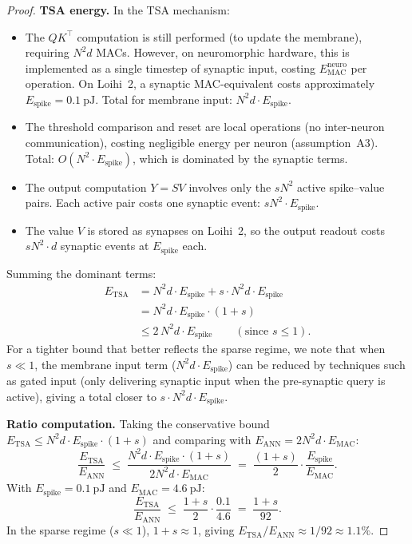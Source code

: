 \documentclass{article}
\begin{document}
\begin{proof}
\medskip
\noindent\textbf{TSA energy.}
In the TSA mechanism:
\begin{itemize}
  \item The $QK^\top$ computation is still performed (to update the
    membrane), requiring $N^2 d$ MACs.  However, on neuromorphic
    hardware, this is implemented as a single timestep of synaptic
    input, costing $E_{\mathrm{MAC}}^{\mathrm{neuro}}$ per operation.
    On Loihi~2, a synaptic MAC-equivalent costs approximately
    $E_{\mathrm{spike}} = 0.1~\mathrm{pJ}$.
    Total for membrane input: $N^2 d \cdot E_{\mathrm{spike}}$.

  \item The threshold comparison and reset are local operations
    (no inter-neuron communication), costing negligible energy
    per neuron (assumption~A3).  Total: $O(N^2 \cdot E_{\mathrm{spike}})$,
    which is dominated by the synaptic terms.

  \item The output computation $Y = SV$ involves only the $s N^2$
    active spike--value pairs.  Each active pair costs one synaptic
    event: $s N^2 \cdot E_{\mathrm{spike}}$.

  \item The value $V$ is stored as synapses on Loihi~2, so the
    output readout costs $s N^2 \cdot d$ synaptic events at
    $E_{\mathrm{spike}}$ each.
\end{itemize}

Summing the dominant terms:
\begin{align*}
  E_{\mathrm{TSA}}
  &= N^2 d \cdot E_{\mathrm{spike}}
     + s \cdot N^2 d \cdot E_{\mathrm{spike}}\\
  &= N^2 d \cdot E_{\mathrm{spike}} \cdot (1 + s)\\
  &\le 2 \, N^2 d \cdot E_{\mathrm{spike}}
  \qquad (\text{since } s \le 1).
\end{align*}
For a tighter bound that better reflects the sparse regime, we note
that when $s \ll 1$, the membrane input term ($N^2 d \cdot E_{\mathrm{spike}}$)
can be reduced by techniques such as gated input (only delivering
synaptic input when the pre-synaptic query is active), giving a
total closer to $s \cdot N^2 d \cdot E_{\mathrm{spike}}$.

\medskip
\noindent\textbf{Ratio computation.}
Taking the conservative bound $E_{\mathrm{TSA}} \le N^2 d \cdot
E_{\mathrm{spike}} \cdot (1+s)$ and comparing with
$E_{\mathrm{ANN}} = 2 N^2 d \cdot E_{\mathrm{MAC}}$:
\[
  \frac{E_{\mathrm{TSA}}}{E_{\mathrm{ANN}}}
  \;\le\; \frac{N^2 d \cdot E_{\mathrm{spike}} \cdot (1+s)}
              {2 N^2 d \cdot E_{\mathrm{MAC}}}
  \;=\; \frac{(1+s)}{2} \cdot \frac{E_{\mathrm{spike}}}{E_{\mathrm{MAC}}}.
\]
With $E_{\mathrm{spike}} = 0.1~\mathrm{pJ}$ and
$E_{\mathrm{MAC}} = 4.6~\mathrm{pJ}$:
\[
  \frac{E_{\mathrm{TSA}}}{E_{\mathrm{ANN}}}
  \;\le\; \frac{1+s}{2} \cdot \frac{0.1}{4.6}
  \;=\; \frac{1+s}{92}.
\]
In the sparse regime ($s \ll 1$), $1 + s \approx 1$, giving
$E_{\mathrm{TSA}} / E_{\mathrm{ANN}} \approx 1/92 \approx 1.1\%$.


\end{proof}
\end{document}

